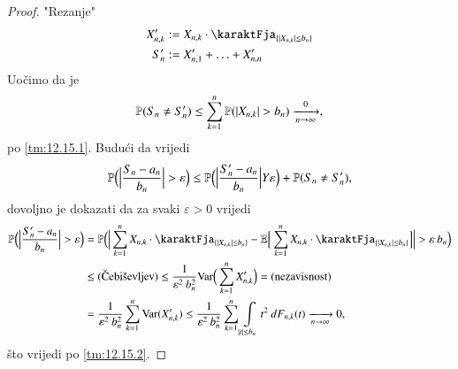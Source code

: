 \begin{proof}
    "Rezanje"
    \begin{equation*}
        \begin{aligned}
            X_{n, k}' &:= X_{n, k} \cdot \karaktFja_{\{ |X_{n, k}| \leq b_n \}}\\
            S_n' & := X_{n, 1}' + \ldots + X_{n, n}' 
        \end{aligned}
    \end{equation*}
    Uo\v cimo da je
    \begin{equation*}
        \mathbb{P}({S_n \neq S_n'}) \leq \sum\limits_{k = 1}^{n} \mathbb{P}({| X_{n, k} | > b_n}) \xrightarrow[n \to \infty] 0,
    \end{equation*}
    po \ref{tm:12.15.1}.
    Budu\' ci da vrijedi
    \begin{equation*}
        \mathbb{P} \Big( \Big| \frac{S_n - a_n}{b_n} \Big| > \varepsilon \Big) \leq \mathbb{P} \Big( \Big| \frac{S_n' - a_n}{b_n} \Big| Y \varepsilon \Big) + \mathbb{P}({S_n \neq S_n'}),
    \end{equation*}
    dovoljno je dokazati da za svaki $\varepsilon > 0$ vrijedi
    \begin{equation*}
        \begin{aligned}
            \masP \Big( \Big| \frac{S_n' - a_n}{b_n} \Big| > \varepsilon \Big) &= \masP \Big( \Big| \suma{k = 1}{n} X_{n, k} \cdot \karaktFja_{\{ |X_{n, k}| \leq b_n \}} - \masE \Big[ \suma{k = 1}{n} X_{n, k} \cdot \karaktFja_{\{ |X_{n, k}| \leq b_n \}} \Big] \Big| > \varepsilon \: b_n \Big)\\
            &\leq (\textnormal{\v Cebi\v sevljev}) \leq \frac{1}{\varepsilon^2 \: b_n^2} \Var \Big( \suma{k = 1}{n} X_{n, k}' \Big) = (\textnormal{nezavisnost})\\
            &= \frac{1}{\varepsilon^2 \: b_n^2} \suma{k = 1}{n} \Var (X_{n, k}') \leq \frac{1}{\varepsilon^2 \: b_n^2} \suma{k = 1}{n} \int\limits_{|t| \leq b_n} t^2 \: dF_{n, k} (t) \xrightarrow[n \to \infty]{} 0,
        \end{aligned}
    \end{equation*}
    \v sto vrijedi po \ref{tm:12.15.2}.
\end{proof}